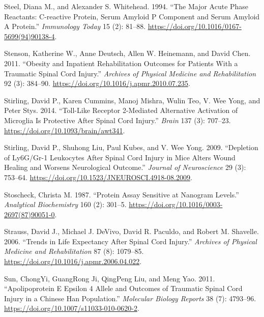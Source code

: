 \documentclass[9pt,lineno]{elife}
\newlength{\cslhangindent}
\newlength{\cslentryspacingunit} %
\newenvironment{CSLReferences}[2] %
 {%
  \setlength{\parindent}{0pt}
  \ifodd #1
  \let\oldpar\par
  \def\par{\hangindent=\cslhangindent\oldpar}
  \fi
  \setlength{\parskip}{#2\cslentryspacingunit}
 }%
 {}
\begin{document}
\begin{landscape}
\begin{landscape}
\begin{landscape}
\begin{landscape}
\begin{CSLReferences}{1}{0}
\leavevmode{}%
Steel, Diana M., and Alexander S. Whitehead. 1994. {``The Major Acute Phase Reactants: {C-reactive} Protein, Serum Amyloid {P} Component and Serum Amyloid {A} Protein.''} \emph{Immunology Today} 15 (2): 81--88. \url{https://doi.org/10.1016/0167-5699(94)90138-4}.

\leavevmode{}%
Stenson, Katherine W., Anne Deutsch, Allen W. Heinemann, and David Chen. 2011. {``Obesity and {Inpatient Rehabilitation Outcomes} for {Patients With} a {Traumatic Spinal Cord Injury}.''} \emph{Archives of Physical Medicine and Rehabilitation} 92 (3): 384--90. \url{https://doi.org/10.1016/j.apmr.2010.07.235}.

\leavevmode{}%
Stirling, David P., Karen Cummins, Manoj Mishra, Wulin Teo, V. Wee Yong, and Peter Stys. 2014. {``Toll-Like Receptor 2-Mediated Alternative Activation of Microglia Is Protective After Spinal Cord Injury.''} \emph{Brain} 137 (3): 707--23. \url{https://doi.org/10.1093/brain/awt341}.

\leavevmode{}%
Stirling, David P., Shuhong Liu, Paul Kubes, and V. Wee Yong. 2009. {``Depletion of {Ly6G}/{Gr-1 Leukocytes} After {Spinal Cord Injury} in {Mice Alters Wound Healing} and {Worsens Neurological Outcome}.''} \emph{Journal of Neuroscience} 29 (3): 753--64. \url{https://doi.org/10.1523/JNEUROSCI.4918-08.2009}.

\leavevmode{}%
Stoscheck, Christa M. 1987. {``Protein Assay Sensitive at Nanogram Levels.''} \emph{Analytical Biochemistry} 160 (2): 301--5. \url{https://doi.org/10.1016/0003-2697(87)90051-0}.

\leavevmode{}%
Strauss, David J., Michael J. DeVivo, David R. Paculdo, and Robert M. Shavelle. 2006. {``Trends in {Life Expectancy After Spinal Cord Injury}.''} \emph{Archives of Physical Medicine and Rehabilitation} 87 (8): 1079--85. \url{https://doi.org/10.1016/j.apmr.2006.04.022}.

\leavevmode{}%
Sun, ChongYi, GuangRong Ji, QingPeng Liu, and Meng Yao. 2011. {``Apolipoprotein {E} Epsilon 4 Allele and Outcomes of Traumatic Spinal Cord Injury in a {Chinese Han} Population.''} \emph{Molecular Biology Reports} 38 (7): 4793--96. \url{https://doi.org/10.1007/s11033-010-0620-2}.


\end{CSLReferences}
\end{landscape}
\end{landscape}
\end{landscape}
\end{landscape}
\end{document}
